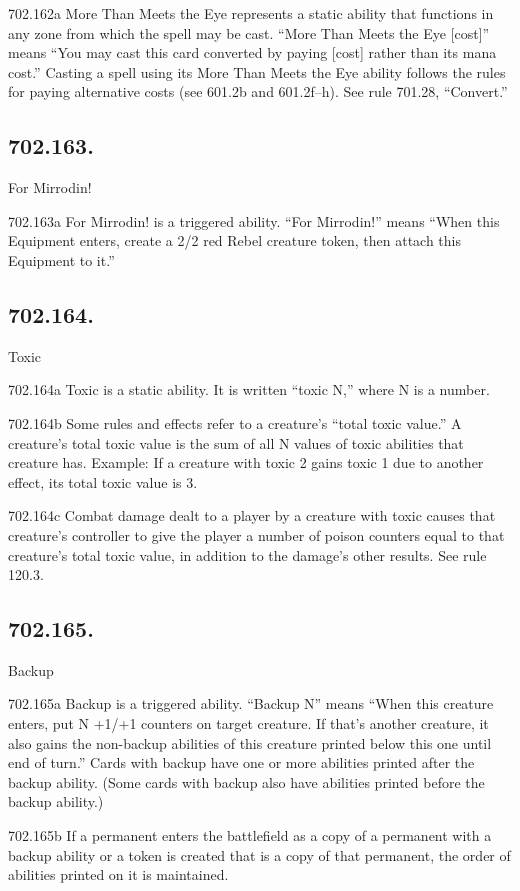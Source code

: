 702.162a More Than Meets the Eye represents a static ability that functions in any zone from which the spell may be cast. “More Than Meets the Eye [cost]” means “You may cast this card converted by paying [cost] rather than its mana cost.” Casting a spell using its More Than Meets the Eye ability follows the rules for paying alternative costs (see 601.2b and 601.2f–h). See rule 701.28, “Convert.”

\subsection*{702.163.}
For Mirrodin!

702.163a For Mirrodin! is a triggered ability. “For Mirrodin!” means “When this Equipment enters, create a 2/2 red Rebel creature token, then attach this Equipment to it.”

\subsection*{702.164.}
Toxic

702.164a Toxic is a static ability. It is written “toxic N,” where N is a number.

702.164b Some rules and effects refer to a creature’s “total toxic value.” A creature’s total toxic value is the sum of all N values of toxic abilities that creature has.
Example: If a creature with toxic 2 gains toxic 1 due to another effect, its total toxic value is 3.

702.164c Combat damage dealt to a player by a creature with toxic causes that creature’s controller to give the player a number of poison counters equal to that creature’s total toxic value, in addition to the damage’s other results. See rule 120.3.

\subsection*{702.165.}
Backup

702.165a Backup is a triggered ability. “Backup N” means “When this creature enters, put N +1/+1 counters on target creature. If that’s another creature, it also gains the non-backup abilities of this creature printed below this one until end of turn.” Cards with backup have one or more abilities printed after the backup ability. (Some cards with backup also have abilities printed before the backup ability.)

702.165b If a permanent enters the battlefield as a copy of a permanent with a backup ability or a token is created that is a copy of that permanent, the order of abilities printed on it is maintained.

